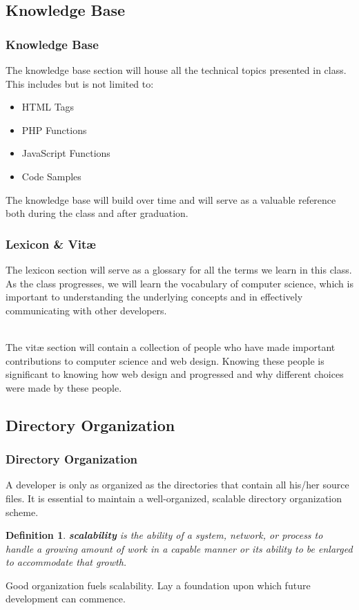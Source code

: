 \documentclass[aspectratio=169]{beamer}
\newtheorem{defn}{Definition}
\begin{document}
\subsection{Knowledge Base}

\begin{frame}
\frametitle{Knowledge Base}
The knowledge base section will house all the technical topics presented in class. This includes but is not limited to:
\begin{itemize}
	\item HTML Tags
	\item PHP Functions
	\item JavaScript Functions
	\item Code Samples
\end{itemize}
The knowledge base will build over time and will serve as a valuable reference both during the class and after graduation.
\end{frame}

\begin{frame}
\frametitle{Lexicon \& Vit\ae}
The lexicon section will serve as a glossary for all the terms we learn in this class. As the class progresses, we will learn the vocabulary of computer science, which is important to understanding the underlying concepts and in effectively communicating with other developers.

\pause
\mbox{}\\
The vit\ae \mbox{} section will contain a collection of people who have made important contributions to computer science and web design. Knowing these people is significant to knowing how web design and progressed and why different choices were made by these people.
\end{frame}

\subsection{Directory Organization}
\begin{frame}
\frametitle{Directory Organization}
A developer is only as organized as the directories that contain all his/her source files. It is essential to maintain a well-organized, scalable directory organization scheme.

\pause
\begin{defn}
\textbf{scalability} is the ability of a system, network, or process to handle a growing amount of work in a capable manner or its ability to be enlarged to accommodate that growth. \cite{wiki-scalability}
\end{defn}
Good organization fuels scalability. Lay a foundation upon which future development can commence.
\end{frame}
\end{document}
